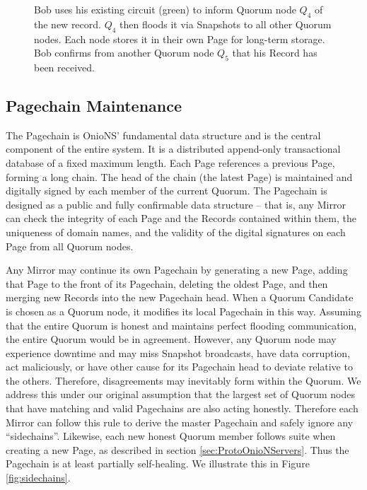 \begin{figure}[htbp]
	\caption{Bob uses his existing circuit (green) to inform Quorum node $ Q_{4} $ of the new record. $ Q_{4} $ then floods it via Snapshots to all other Quorum nodes. Each node stores it in their own Page for long-term storage. Bob confirms from another Quorum node $ Q_{5} $ that his Record has been received.}
	\label{fig:recordBroadcast}
\end{figure}

\subsection{Pagechain Maintenance}

The Pagechain is OnioNS' fundamental data structure and is the central component of the entire system. It is a distributed append-only transactional database of a fixed maximum length. Each Page references a previous Page, forming a long chain. The head of the chain (the latest Page) is maintained and digitally signed by each member of the current Quorum. The Pagechain is designed as a public and fully confirmable data structure -- that is, any Mirror can check the integrity of each Page and the Records contained within them, the uniqueness of domain names, and the validity of the digital signatures on each Page from all Quorum nodes.

Any Mirror may continue its own Pagechain by generating a new Page, adding that Page to the front of its Pagechain, deleting the oldest Page, and then merging new Records into the new Pagechain head. When a Quorum Candidate is chosen as a Quorum node, it modifies its local Pagechain in this way. Assuming that the entire Quorum is honest and maintains perfect flooding communication, the entire Quorum would be in agreement. However, any Quorum node may experience downtime and may miss Snapshot broadcasts, have data corruption, act maliciously, or have other cause for its Pagechain head to deviate relative to the others. Therefore, disagreements may inevitably form within the Quorum. We address this under our original assumption that the largest set of Quorum nodes that have matching and valid Pagechains are also acting honestly. Therefore each Mirror can follow this rule to derive the master Pagechain and safely ignore any ``sidechains''. Likewise, each new honest Quorum member follows suite when creating a new Page, as described in section \ref{sec:ProtoOnioNServers}. Thus the Pagechain is at least partially self-healing. We illustrate this in Figure \ref{fig:sidechains}.


